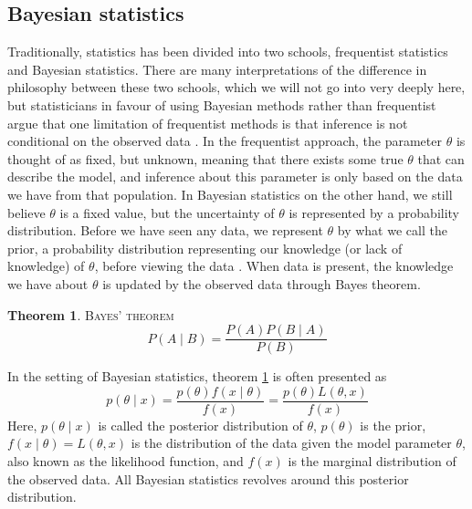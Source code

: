 \documentclass{article}
\theoremstyle{definition}
\newtheorem{theorem}{Theorem}[section]
\begin{document}
\subsection{Bayesian statistics}\label{sec:bayesian}
Traditionally, statistics has been divided into two schools, frequentist statistics and Bayesian statistics. There are many interpretations of the difference in philosophy between these two schools, which we will not go into very deeply here, but statisticians in favour of using Bayesian methods  rather than frequentist argue that one limitation of frequentist methods is that inference is not conditional on the observed data \cite{Wagenmakers}.   In the frequentist approach, the parameter $\theta$ is thought of as  fixed, but unknown, meaning that there exists some true $\theta$ that can describe the model, and inference about this parameter is only based on the data we have from that population. In Bayesian statistics on the other hand, we still believe $\theta$ is a fixed value, but the uncertainty of $\theta$ is represented by a probability distribution. Before we have seen any data, we represent $\theta$ by what we call the prior, a probability distribution representing our knowledge (or lack of knowledge) of $\theta$, before viewing the data \cite{SI}. 
When data is present, the knowledge we have about $\theta$ is updated by the observed data through Bayes theorem. 
\begin{theorem}{\textsc{Bayes' theorem}}\label{eq:Bayes}
\vspace{1em}
\begin{equation}
    P\left(A\mid B \right) = \frac{P\left(A\right)P\left(B\mid A \right)}{P\left(B\right)}
\end{equation}
\end{theorem} In the setting of Bayesian statistics, theorem \ref{eq:Bayes} is often presented as
\begin{equation*}
p\left(\theta\mid x\right) = \frac{p\left(\theta\right)f\left(x\mid\theta\right)}{f\left(x\right)} = \frac{p\left(\theta\right)L\left(\theta, x\right)}{f\left(x\right)}
\end{equation*}
Here, $p\left(\theta\mid x \right)$ is called the posterior distribution of $\theta$, $p\left(\theta\right)$ is the prior, $f\left(x\mid\theta\right) = L\left(\theta, x\right)$ is the distribution of the data given the model parameter $\theta$, also known as the likelihood function, and $f\left(x\right)$ is the marginal distribution of the observed data. 
All Bayesian statistics revolves around this posterior distribution. 
\end{document}
